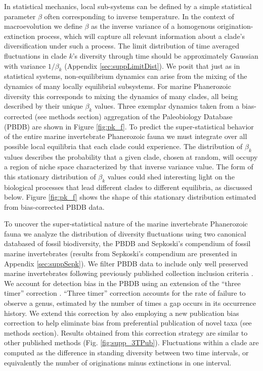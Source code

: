 \documentclass[11pt]{article}
\begin{document}
In statistical mechanics, local sub-systems can be defined by a simple
statistical parameter $\beta$ often corresponding to inverse
temperature. In the context of macroevolution we define $\beta$ as the
inverse variance of a homogenous origination-extinction process, which
will capture all relevant information about a clade's diversification
under such a process.  The limit distribution of time averaged
fluctuations in clade $k$'s diversity through time should be
approximately Gaussian with variance $1/\beta_k$ (Appendix
\ref{sec:suppLimitDist}). We posit that just as in statistical
systems, non-equilibrium dynamics can arise from the mixing of the
dynamics of many locally equilibrial subsystems. For marine
Phanerozoic diversity this corresponds to mixing the dynamics of many
clades, all being described by their unique $\beta_k$ values.  Three
exemplar dynamics taken from a bias-corrected (see methods section)
aggregation of the Paleobiology Database (PBDB) \citep{alroy08} are
shown in Figure \ref{fig:pk_f}.
To predict the super-statistical behavior of the entire marine
invertebrate Phanerozoic fauna we must integrate over all possible
local equilibria that each clade could experience. The distribution of
$\beta_k$ values describes the probability that a given clade, chosen
at random, will occupy a region of niche space characterized by that
inverse variance value. The form of this stationary distribution of
$\beta_k$ values could shed interesting light on the biological
processes that lead different clades to different equilibria, as
discussed below.  Figure \ref{fig:pk_f} shows the shape of this
stationary distribution estimated from bias-corrected PBDB
\citep{alroy08} data.

To uncover the super-statistical nature of the marine invertebrate
Phanerozoic fauna we analyze the distribution of diversity
fluctuations using two canonical databased of fossil biodiversity, the
PBDB \citep{alroy08} and Sepkoski's compendium \citep{sepkoski1992} of
fossil marine invertebrates (results from Sepkoski's compendium are
presented in Appendix \ref{sec:suppSepk}).  We filter PBDB
data to include only well preserved marine invertebrates following
previously published collection inclusion criteria \citep{alroy08,
  alroy2010}.  We account for detection bias in the PBDB using an
extension of the ``three timer'' correction \citep{alroy08}. ``Three
timer'' correction accounts for the rate of failure to observe a
genus, estimated by the number of times a gap occurs in its occurrence
history. We extend this correction by also employing a new publication
bias correction to help eliminate bias from preferential publication
of novel taxa (see methods section). Results obtained from this
correction strategy are similar to other published methods
(Fig. \ref{fig:supp_3TPub}). Fluctuations within a clade are computed
as the difference in standing diversity between two time intervals, or
equivalently the number of originations minus extinctions in one
interval.
\end{document}
